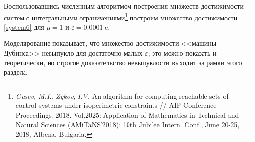 \documentclass[../main.tex]{subfiles}
\begin{document}
Воспользовавшись численным алгоритмом построения множеств достижимости систем с интегральными ограничениями\footnote{\textit{Gusev, M.I., Zykov, I.V.} An algorithm for computing reachable sets of control systems under isoperimetric constraints // AIP Conference Proceedings. 2018. Vol.2025: Application of Mathematics in Technical and Natural Sciences (AMiTaNS'2018): 10th Jubilee Intern. Conf., June 20-25, 2018, Albena, Bulgaria.} построим множество достижимости \eqref{system6} для $ \mu = 1  $ и $ \varepsilon = 0.0001  $ c. 

Моделирование показывает, что множество достижимости <<машины Дубинса>> невыпукло для достаточно малых $ \varepsilon $; это можно показать и теоретически, но строгое доказательство невыпуклости выходит за рамки этого раздела.
\end{document}
